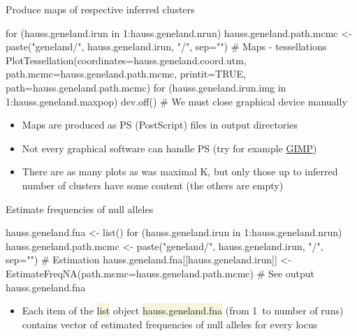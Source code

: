 \documentclass[compress, ucs, xelatex, 11pt, xcolor=svgnames, aspectratio=169,
	hyperref={
		bookmarks=true,
		unicode=true,
		colorlinks=true,
		pdftitle={Molecular data in R},
		plainpages=false,
		pdfauthor={Vojtech Zeisek},
		pdfsubject={Course about phylogeny and evolution in R},
		pdfcreator={XeLaTeX},
		pdfkeywords={R, evolution, phylogeny, molecular data},
		linkcolor=Crimson, %
		anchorcolor=Magenta, %
		citecolor=Magenta, %
		filecolor=Magenta, %
		menucolor=Magenta, %
		urlcolor=DodgerBlue, %
		pdftex},
	url={hyphens, lowtilde} %
	]{beamer}
\renewcommand{\texttt}[1]{\colorbox{Beige}{{\ttfamily #1}}}
\begin{document}
\begin{frame}[fragile]{Produce maps of respective inferred clusters}
	\begin{spluscode}
    for (hauss.geneland.irun in 1:hauss.geneland.nrun) {
      hauss.geneland.path.mcmc <- paste("geneland/",
        hauss.geneland.irun, "/", sep="")
      # Maps - tessellations
      PlotTessellation(coordinates=hauss.geneland.coord.utm,
        path.mcmc=hauss.geneland.path.mcmc, printit=TRUE,
        path=hauss.geneland.path.mcmc)
      for (hauss.geneland.irun.img in 1:hauss.geneland.maxpop) {
        dev.off() } # We must close graphical device manually
      }
	\end{spluscode}
	\begin{itemize}
		\item Maps are produced as PS (PostScript) files in output directories
		\item Not every graphical software can handle PS (try for example \href{https://www.gimp.org/}{GIMP})
		\item There are as many plots as was maximal K, but only those up to inferred number of clusters have some content (the others are empty)
	\end{itemize}
\end{frame}

\begin{frame}[fragile]{Estimate frequencies of null alleles}
	\begin{spluscode}
    hauss.geneland.fna <- list()
    for (hauss.geneland.irun in 1:hauss.geneland.nrun) {
      hauss.geneland.path.mcmc <- paste("geneland/", hauss.geneland.irun,
        "/", sep="")
      # Estimation
      hauss.geneland.fna[[hauss.geneland.irun]] <-
        EstimateFreqNA(path.mcmc=hauss.geneland.path.mcmc)
      }
    # See output
    hauss.geneland.fna
	\end{spluscode}
	\begin{itemize}
		\item Each item of the \texttt{list} object \texttt{hauss.geneland.fna} (from 1~to number of runs) contains vector of estimated frequencies of null alleles for every locus
	\end{itemize}
\end{frame}
\end{document}

